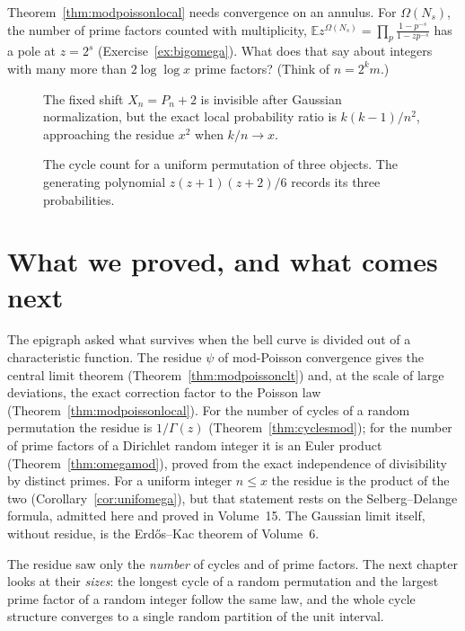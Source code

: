 \begin{think}
Theorem~\ref{thm:modpoissonlocal} needs convergence on an annulus. For $\Omega(N_s)$, the number of prime factors counted with multiplicity, $\mathbb Ez^{\Omega(N_s)}=\prod_p\frac{1-p^{-s}}{1-zp^{-s}}$ has a pole at $z=2^s$ (Exercise~\ref{ex:bigomega}). What does that
say about integers with many more than $2\log\log x$ prime factors? (Think of $n=2^km$.)
\end{think}

\begin{figure}[ht]
\centering{}
\caption{The fixed shift $X_n=P_n+2$ is invisible after Gaussian normalization, but the exact local probability ratio is $k(k-1)/n^2$, approaching the residue $x^2$ when $k/n\to x$.}
\label{fig:v11-ch11-shift-ratio}
\end{figure}

\begin{figure}[ht]
\centering{}
\caption{The cycle count for a uniform permutation of three objects. The generating polynomial $z(z+1)(z+2)/6$ records its three probabilities.}
\label{fig:v11-ch11-cycle-three}
\end{figure}

\section{What we proved, and what comes next}

The epigraph asked what survives when the bell curve is divided out of a characteristic function. The residue $\psi$ of mod-Poisson convergence gives
the central limit theorem (Theorem~\ref{thm:modpoissonclt}) and, at the scale of large deviations, the exact correction factor to the Poisson law
(Theorem~\ref{thm:modpoissonlocal}). For the number of cycles of a random permutation the residue is $1/\Gamma(z)$ (Theorem~\ref{thm:cyclesmod}); for
the number of prime factors of a Dirichlet random integer it is an Euler product (Theorem~\ref{thm:omegamod}), proved from the exact independence of
divisibility by distinct primes. For a uniform integer $n\le x$ the residue is the product of the two (Corollary~\ref{cor:unifomega}), but that
statement rests on the Selberg--Delange formula, admitted here and proved in Volume~15. The Gaussian limit itself, without residue, is the
Erd\H os--Kac theorem of Volume~6.

The residue saw only the \emph{number} of cycles and of prime factors. The next chapter looks at their \emph{sizes}: the longest cycle of a random
permutation and the largest prime factor of a random integer follow the same law, and the whole cycle structure converges to a single random
partition of the unit interval.

